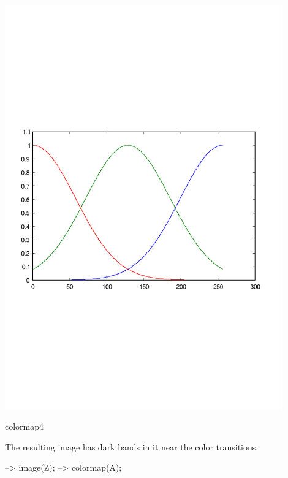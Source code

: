  
\begin{DoxyImage}
\includegraphics[width=12cm]{colormap4}
\caption{colormap4}
\end{DoxyImage}


The resulting image has dark bands in it near the color transitions.


\begin{DoxyVerbInclude}
--> image(Z);
--> colormap(A);
\end{DoxyVerbInclude}


